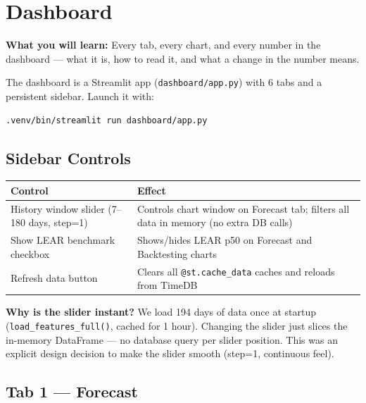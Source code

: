 \documentclass[12pt, a4paper, oneside]{memoir}
\newcommand{\code}[1]{\texttt{\footnotesize #1}}
\newcommand{\filepath}[1]{\textcolor{se3blue}{\texttt{\footnotesize #1}}}
\begin{document}
\chapter{Dashboard}\label{ch:dashboard}

\begin{chapterintro}
\sffamily\small\textbf{What you will learn:} Every tab, every chart, and every number
in the dashboard --- what it is, how to read it, and what a change in the number means.
\end{chapterintro}

The dashboard is a Streamlit app (\filepath{dashboard/app.py}) with 6 tabs and a
persistent sidebar. Launch it with:
\begin{verbatim}
.venv/bin/streamlit run dashboard/app.py
\end{verbatim}

\section{Sidebar Controls}

\begin{center}
\begin{tabular}{ll}
\toprule
\textbf{Control} & \textbf{Effect} \\
\midrule
History window slider (7--180 days, step=1) & Controls chart window on Forecast tab; filters all data in memory (no extra DB calls) \\
Show LEAR benchmark checkbox & Shows/hides LEAR p50 on Forecast and Backtesting charts \\
Refresh data button & Clears all \code{@st.cache\_data} caches and reloads from TimeDB \\
\bottomrule
\end{tabular}
\end{center}

\begin{keyidea}
\textbf{Why is the slider instant?} We load 194 days of data once at startup
(\code{load\_features\_full()}, cached for 1 hour). Changing the slider just slices
the in-memory DataFrame --- no database query per slider position. This was an explicit
design decision to make the slider smooth (step=1, continuous feel).
\end{keyidea}

\section{Tab 1 --- Forecast}
\end{document}
